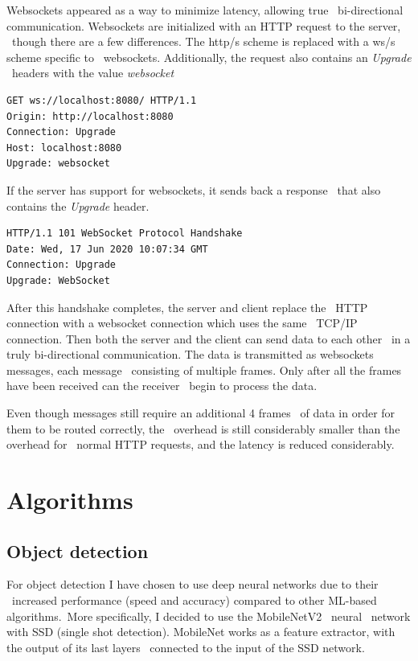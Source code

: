 Websockets appeared as a way to minimize latency, allowing true \
bi-directional communication.
Websockets are initialized with an HTTP request to the server, \
though there are a few differences.
The http/s scheme is replaced with a ws/s scheme specific to \
websockets.
Additionally, the request also contains an \textit{Upgrade} \
headers with the value \textit{websocket}

\begin{verbatim}
GET ws://localhost:8080/ HTTP/1.1
Origin: http://localhost:8080
Connection: Upgrade
Host: localhost:8080
Upgrade: websocket
\end{verbatim}

If the server has support for websockets, it sends back a response \
that also contains the \textit{Upgrade} header.

\begin{verbatim}
HTTP/1.1 101 WebSocket Protocol Handshake
Date: Wed, 17 Jun 2020 10:07:34 GMT
Connection: Upgrade
Upgrade: WebSocket
\end{verbatim}

After this handshake completes, the server and client replace the \
HTTP connection with a websocket connection which uses the same \
TCP/IP connection.
Then both the server and the client can send data to each other \
in a truly bi-directional communication.
The data is transmitted as websockets messages, each message \
consisting of multiple frames.
Only after all the frames have been received can the receiver \
begin to process the data.

Even though messages still require an additional 4\-12 frames \
of data in order for them to be routed correctly, the \
overhead is still considerably smaller than the overhead for \
normal HTTP requests, and the latency is reduced considerably.


\section{Algorithms}
\label{sec:analysis-algorithms}

\subsection{Object detection}
\label{subsec:analysis-object-detection}

For object detection I have chosen to use deep neural networks due to their \
increased performance (speed and accuracy) compared to other ML-based algorithms.\
More specifically, I decided to use the  MobileNetV2~\cite{mobilenet2} neural \
network with SSD (single shot detection).
MobileNet works as a feature extractor, with the output of its last layers \
connected to the input of the SSD network.

